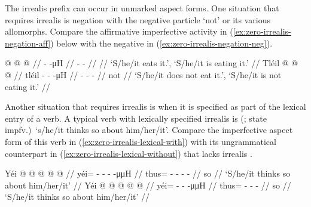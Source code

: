 \documentclass[12pt,letterpaper,landscape,oneside,article]{memoir}
\begin{document}
\begin{multicols}{2}
\noindent
The irrealis prefix  can occur in unmarked aspect forms.
One situation that requires irrealis  is negation with the negative particle  ‘not’ or its various allomorphs.
Compare the affirmative imperfective activity in (\ref{ex:zero-irrealis-negation-aff}) below with the negative in (\ref{ex:zero-irrealis-negation-neg}).

\pex\label{ex:zero-irrealis-negation}%
\a\label{ex:zero-irrealis-negation-aff}%
%
\begingl
	\gla	{} @ {} @ {} @ {} //
	\glb	{}-  -μH //
	\glc	{}-  - //
	\gld	{} {} {} {} //
	\glft	‘S/he/it eats it.’, ‘S/he/it is eating it.’
		//
\endgl
\a\label{ex:zero-irrealis-negation-neg}%
%
\begingl
	\gla	Tléil  @ {} @ {} @ {} //
	\glb	tléil - -  -μH //
	\glc	{} - -  - //
	\gld	not  {} {} {} //
	\glft	‘S/he/it does not eat it.’, ‘S/he/it is not eating it.’
		//
\endgl
\xe

Another situation that requires irrealis  is when it is specified as part of the lexical entry of a verb.
A typical verb with lexically specified irrealis is  (;  state impfv.)\ ‘s/he/it thinks so about him/her/it’.
Compare the imperfective aspect form of this verb in (\ref{ex:zero-irrealis-lexical-with}) with its ungrammatical counterpart in (\ref{ex:zero-irrealis-lexical-without}) that lacks irrealis .

\pex\label{ex:zero-irrealis-lexical}%
\a\label{ex:zero-irrealis-lexical-with}%
%
\begingl
	\gla	Yéi @  @ {} @ {} @ {} @ {} //
	\glb	yéi= - - -  -μμH //
	\glc	thus= - - -  - //
	\gld	so  {} {} {} {} //
	\glft	‘S/he/it thinks so about him/her/it’
		//
\endgl
\a\label{ex:zero-irrealis-lexical-without}%
\ljudge{*}%
%
\begingl
	\gla	Yéi @  @ {} @ {} @ {} @ {} //
	\glb	yéi= -  -  -μμH //
	\glc	thus= -  -  - //
	\gld	so  {} {} {} {} //
	\glft	‘S/he/it thinks so about him/her/it’
		//
\endgl
\xe


\end{multicols}
\end{document}
